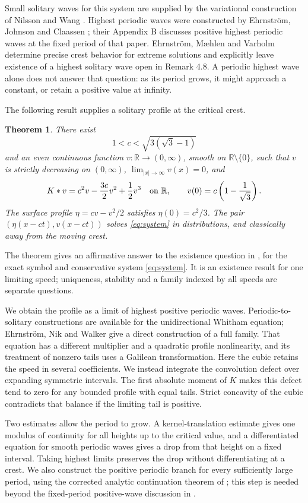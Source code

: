 \documentclass[11pt,a4paper]{article}
\newtheorem{theorem}{Theorem}[section]
\theoremstyle{remark}
\newcommand{\R}{\mathbb R}
\begin{document}
Small solitary waves for this system are supplied by the variational
construction of Nilsson and Wang \cite[Theorem 3.1]{NW}. Highest periodic
waves were constructed by Ehrnstr\"om, Johnson and Claassen \cite{EJC};
their Appendix B discusses positive highest periodic waves at the fixed
period of that paper. Ehrnstr\"om, M{\ae}hlen and Varholm
\cite[Section 4.2]{EMV} determine precise crest behavior for extreme
solutions and explicitly leave existence of a highest solitary wave
open in Remark 4.8. A periodic highest wave alone does not answer that
question: as its period grows, it might approach a constant, or retain
a positive value at infinity.

The following result supplies a solitary profile at the critical crest.
\begin{theorem}\label{thm:main}
There exist
\[
 1<c<\sqrt{3(\sqrt3-1)}
\]
and an even continuous function $v:\R\to(0,\infty)$, smooth on
$\R\setminus\{0\}$, such that $v$ is strictly decreasing on
$(0,\infty)$, $\lim_{|x|\to\infty}v(x)=0$, and
\[
 K*v=c^2v-\frac{3c}{2}v^2+\frac12v^3
 \quad\hbox{on }\R,\qquad
 v(0)=c\left(1-\frac1{\sqrt3}\right).
\]
The surface profile $\eta=cv-v^2/2$ satisfies $\eta(0)=c^2/3$.
The pair $(\eta(x-ct),v(x-ct))$ solves \eqref{eq:system} in
distributions, and classically away from the moving crest.
\end{theorem}

The theorem gives an affirmative answer to the existence question in
\cite[Remark 4.8]{EMV}, for the exact symbol and conservative system
\eqref{eq:system}. It is an existence result for one limiting speed;
uniqueness, stability and a family indexed by all speeds are separate
questions.

We obtain the profile as a limit of highest positive periodic waves.
Periodic-to-solitary constructions are available for the unidirectional
Whitham equation; Ehrnstr\"om, Nik and Walker \cite{ENW} give a direct
construction of a full family. That equation has a different multiplier
and a quadratic profile nonlinearity, and its treatment of nonzero tails
uses a Galilean transformation. Here the cubic retains the speed in
several coefficients. We instead integrate the convolution defect over
expanding symmetric intervals. The first absolute moment of $K$ makes
this defect tend to zero for any bounded profile with equal tails. Strict
concavity of the cubic contradicts that balance if the limiting tail is
positive.

Two estimates allow the period to grow. A kernel-translation estimate
gives one modulus of continuity for all heights up to the critical value,
and a differentiated equation for smooth periodic waves gives a drop from
that height on a fixed interval. Taking highest limits preserves the drop
without differentiating at a crest. We also construct the positive
periodic branch for every sufficiently large period, using the corrected
analytic continuation theorem of \cite{CSV}; this step is needed beyond
the fixed-period positive-wave discussion in \cite{EJC}.
\end{document}
